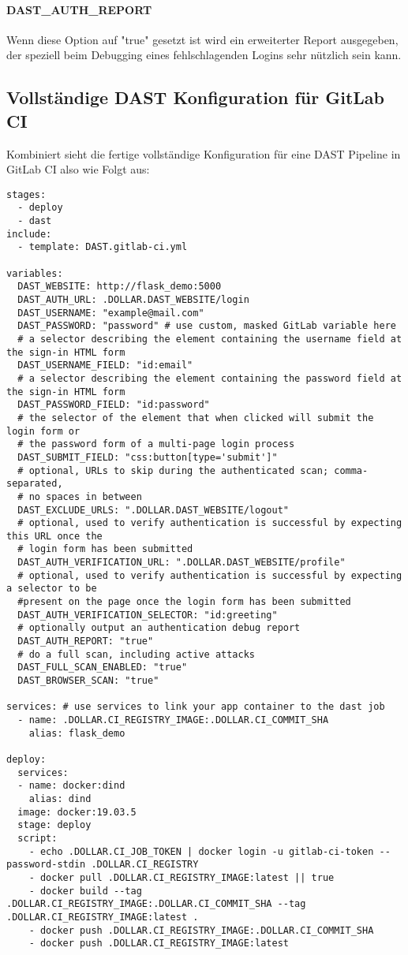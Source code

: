 \paragraph{DAST\_AUTH\_REPORT}
Wenn diese Option auf "true" gesetzt ist wird ein erweiterter Report ausgegeben, der speziell beim Debugging eines fehlschlagenden Logins sehr nützlich sein kann.
\newpage
\subsection{Vollständige DAST Konfiguration für GitLab CI}

Kombiniert sieht die fertige vollständige Konfiguration für eine DAST Pipeline in GitLab CI also wie Folgt aus:
\begin{verbatim}
stages:
  - deploy
  - dast
include:
  - template: DAST.gitlab-ci.yml

variables:
  DAST_WEBSITE: http://flask_demo:5000
  DAST_AUTH_URL: .DOLLAR.DAST_WEBSITE/login
  DAST_USERNAME: "example@mail.com"
  DAST_PASSWORD: "password" # use custom, masked GitLab variable here
  # a selector describing the element containing the username field at the sign-in HTML form
  DAST_USERNAME_FIELD: "id:email"
  # a selector describing the element containing the password field at the sign-in HTML form
  DAST_PASSWORD_FIELD: "id:password"
  # the selector of the element that when clicked will submit the login form or
  # the password form of a multi-page login process
  DAST_SUBMIT_FIELD: "css:button[type='submit']"
  # optional, URLs to skip during the authenticated scan; comma-separated,
  # no spaces in between
  DAST_EXCLUDE_URLS: ".DOLLAR.DAST_WEBSITE/logout"
  # optional, used to verify authentication is successful by expecting this URL once the
  # login form has been submitted
  DAST_AUTH_VERIFICATION_URL: ".DOLLAR.DAST_WEBSITE/profile"
  # optional, used to verify authentication is successful by expecting a selector to be
  #present on the page once the login form has been submitted
  DAST_AUTH_VERIFICATION_SELECTOR: "id:greeting"
  # optionally output an authentication debug report
  DAST_AUTH_REPORT: "true"
  # do a full scan, including active attacks
  DAST_FULL_SCAN_ENABLED: "true"
  DAST_BROWSER_SCAN: "true"

services: # use services to link your app container to the dast job
  - name: .DOLLAR.CI_REGISTRY_IMAGE:.DOLLAR.CI_COMMIT_SHA
    alias: flask_demo

deploy:
  services:
  - name: docker:dind
    alias: dind
  image: docker:19.03.5
  stage: deploy
  script:
    - echo .DOLLAR.CI_JOB_TOKEN | docker login -u gitlab-ci-token --password-stdin .DOLLAR.CI_REGISTRY
    - docker pull .DOLLAR.CI_REGISTRY_IMAGE:latest || true
    - docker build --tag .DOLLAR.CI_REGISTRY_IMAGE:.DOLLAR.CI_COMMIT_SHA --tag .DOLLAR.CI_REGISTRY_IMAGE:latest .
    - docker push .DOLLAR.CI_REGISTRY_IMAGE:.DOLLAR.CI_COMMIT_SHA
    - docker push .DOLLAR.CI_REGISTRY_IMAGE:latest
\end{verbatim}
